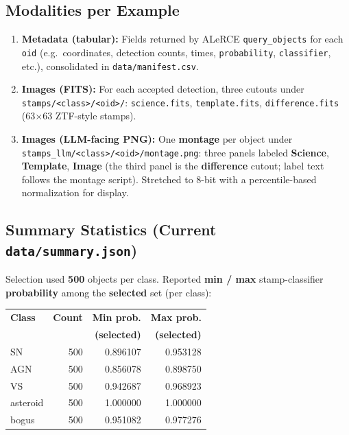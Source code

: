 \documentclass[11pt,a4paper]{article}
\begin{document}
\subsection{Modalities per Example}

\begin{enumerate}[leftmargin=*]
  \item \textbf{Metadata (tabular):} Fields returned by ALeRCE \texttt{query\_objects} for each \texttt{oid} (e.g.\ coordinates, detection counts, times, \texttt{probability}, \texttt{classifier}, etc.), consolidated in \texttt{data/manifest.csv}.
  \item \textbf{Images (FITS):} For each accepted detection, three cutouts under \texttt{stamps/<class>/<oid>/}: \texttt{science.fits}, \texttt{template.fits}, \texttt{difference.fits} (63$\times$63 ZTF-style stamps).
  \item \textbf{Images (LLM-facing PNG):} One \textbf{montage} per object under \texttt{stamps\_llm/<class>/<oid>/montage.png}: three panels labeled \textbf{Science}, \textbf{Template}, \textbf{Image} (the third panel is the \textbf{difference} cutout; label text follows the montage script). Stretched to 8-bit with a percentile-based normalization for display.
\end{enumerate}

\subsection{Summary Statistics (Current \texttt{data/summary.json})}

Selection used \textbf{500} objects per class. Reported \textbf{min / max} stamp-classifier \textbf{probability} among the \textbf{selected} set (per class):

\begin{center}
\begin{tabular}{l r r r}
\toprule
\textbf{Class} & \textbf{Count} & \textbf{Min prob.} & \textbf{Max prob.} \\
 & & \textbf{(selected)} & \textbf{(selected)} \\
\midrule
SN & 500 & 0.896107 & 0.953128 \\
AGN & 500 & 0.856078 & 0.898750 \\
VS & 500 & 0.942687 & 0.968923 \\
asteroid & 500 & 1.000000 & 1.000000 \\
bogus & 500 & 0.951082 & 0.977276 \\
\bottomrule
\end{tabular}
\end{center}
\end{document}
